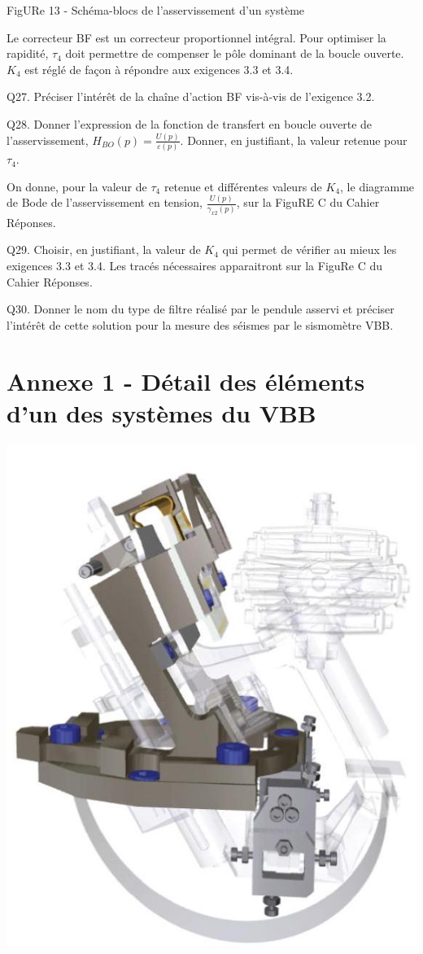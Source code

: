 \documentclass[10pt]{article}
\begin{document}
FigURe 13 - Schéma-blocs de l'asservissement d'un système

Le correcteur BF est un correcteur proportionnel intégral. Pour optimiser la rapidité, $\tau_{4}$ doit permettre de compenser le pôle dominant de la boucle ouverte. $K_{4}$ est réglé de façon à répondre aux exigences 3.3 et 3.4.

Q27. Préciser l'intérêt de la chaîne d'action BF vis-à-vis de l'exigence 3.2.

Q28. Donner l'expression de la fonction de transfert en boucle ouverte de l'asservissement, $H_{B O}(p)=\frac{U(p)}{\varepsilon(p)}$. Donner, en justifiant, la valeur retenue pour $\tau_{4}$.

On donne, pour la valeur de $\tau_{4}$ retenue et différentes valeurs de $K_{4}$, le diagramme de Bode de l'asservissement en tension, $\frac{U(p)}{\gamma_{x 2}(p)}$, sur la FiguRE C du Cahier Réponses.

Q29. Choisir, en justifiant, la valeur de $K_{4}$ qui permet de vérifier au mieux les exigences 3.3 et 3.4. Les tracés nécessaires apparaitront sur la FiguRe $\mathrm{C}$ du Cahier Réponses.

Q30. Donner le nom du type de filtre réalisé par le pendule asservi et préciser l'intérêt de cette solution pour la mesure des séismes par le sismomètre VBB.

\section*{Annexe 1 - Détail des éléments d'un des systèmes du VBB}
\begin{center}
\includegraphics[max width=\textwidth]{2024_04_26_3285cfc264024262add0g-15(3)}
\end{center}
\end{document}
